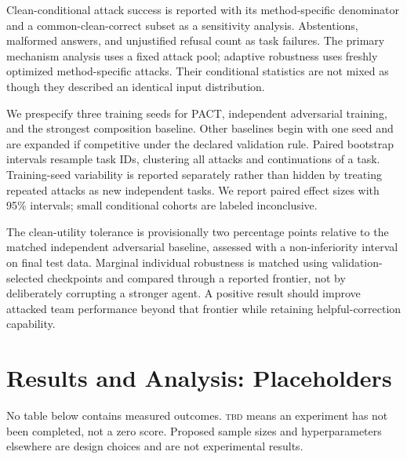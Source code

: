 \documentclass[10pt,twocolumn]{article}
\newcommand{\method}{\textsc{PACT}}
\newcommand{\TBD}{\textsc{tbd}}
\begin{document}
Clean-conditional attack success is reported with its method-specific denominator and a common-clean-correct subset as a sensitivity analysis. Abstentions, malformed answers, and unjustified refusal count as task failures. The primary mechanism analysis uses a fixed attack pool; adaptive robustness uses freshly optimized method-specific attacks. Their conditional statistics are not mixed as though they described an identical input distribution.

We prespecify three training seeds for \method{}, independent adversarial training, and the strongest composition baseline. Other baselines begin with one seed and are expanded if competitive under the declared validation rule. Paired bootstrap intervals resample task IDs, clustering all attacks and continuations of a task. Training-seed variability is reported separately rather than hidden by treating repeated attacks as new independent tasks. We report paired effect sizes with 95\% intervals; small conditional cohorts are labeled inconclusive.

The clean-utility tolerance is provisionally two percentage points relative to the matched independent adversarial baseline, assessed with a non-inferiority interval on final test data. Marginal individual robustness is matched using validation-selected checkpoints and compared through a reported frontier, not by deliberately corrupting a stronger agent. A positive result should improve attacked team performance beyond that frontier while retaining helpful-correction capability.

\section{Results and Analysis: Placeholders}
\label{sec:results}
No table below contains measured outcomes. \TBD{} means an experiment has not been completed, not a zero score. Proposed sample sizes and hyperparameters elsewhere are design choices and are not experimental results.
\end{document}
